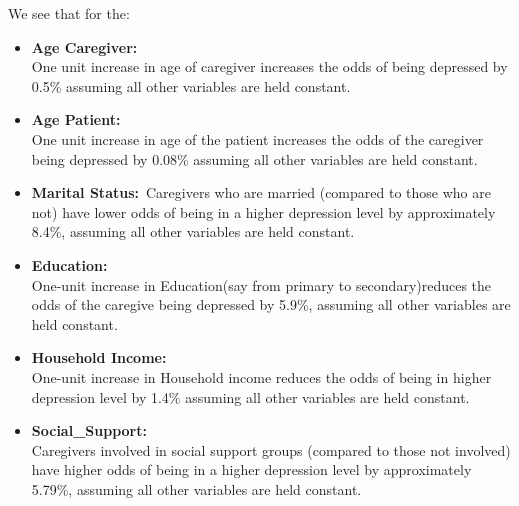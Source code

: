 \documentclass[12pt]{article}\usepackage[]{graphicx}\usepackage[]{xcolor}
\numberwithin{equation}{section}
\numberwithin{figure}{section}
\begin{document}
\noindent We see that for the:
\begin{itemize}
\item \textbf{Age Caregiver:}\\
\noindent One unit increase in age of caregiver increases the odds of being depressed by 0.5\% assuming all other variables are held constant.

\item \textbf{Age Patient:}\\
\noindent One unit increase in age of the patient increases the odds of the caregiver being depressed by 0.08\% assuming all other variables are held constant.

\item \textbf{Marital Status:}\
\noindent Caregivers who are married (compared to those who are not) have lower odds of being in a higher depression level by approximately 8.4\%, assuming all other variables are held constant.
\item \textbf{Education:} \\
\noindent One-unit increase in Education(say from primary to secondary)reduces the odds of the caregive being depressed by 5.9\%,  assuming all other variables are held constant.

\item \textbf{Household Income:} \\
\noindent One-unit increase in Household income reduces the odds of being in higher depression level by 1.4\% assuming all other variables are held constant.

\item \textbf{Social\_Support:} \\
\noindent Caregivers involved in social support groups (compared to those not involved) have higher odds of being in a higher depression level by approximately 5.79\%, assuming all other variables are held constant.
\end{itemize}
\end{document}
